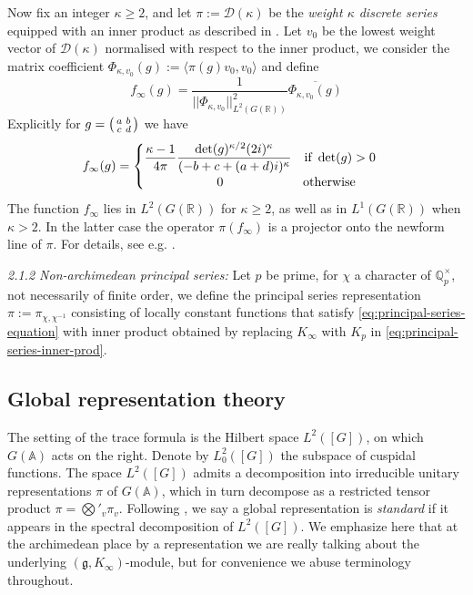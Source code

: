 \documentclass{article}
\numberwithin{equation}{section}
\begin{document}
\noindent Now fix an integer $\kappa \geq 2$, and let $\pi:=\mathcal{D}(\kappa)$ be the \emph{weight $\kappa$ discrete series} equipped with an inner product as described in \cite[\S11.7]{Traces}. Let $v_0$ be the lowest weight vector of $\mathcal{D}(\kappa)$ normalised with respect to the inner product, we consider the matrix coefficient $\Phi_{\kappa,v_0}(g):=\langle \pi(g)v_0,v_0 \rangle$ and define
$$f_\infty(g)=\frac{1}{||\Phi_{\kappa,v_0}||^2_{L^2(G(\mathbb{R}))}}\overline{\Phi_{\kappa, v_0}(g)}$$
Explicitly for $g=\begin{psmallmatrix}
    a & b \\ c & d
\end{psmallmatrix}$ we have
\begin{equation}\label{def:matrix-coeff}
    f_\infty(g) = 
    \begin{cases}
        \displaystyle\frac{\kappa-1}{4\pi} \frac{\det(g)^{\kappa/2}(2i)^\kappa}{(-b+c+(a+d)i)^\kappa} \quad \text{if } \det(g)> 0 \\
        \hspace{2cm} 0 \hspace{2.2cm} \text{otherwise}
    \end{cases}
\end{equation}
The function $f_\infty$ lies in $L^2(G(\mathbb{R}))$ for $\kappa\geq 2$, as well as in $L^1(G(\mathbb{R}))$ when $\kappa>2$. In the latter case the operator $\pi(f_\infty)$ is a projector onto the newform line of $\pi$. For details, see e.g. \cite[\S 14]{Traces}. \bigbreak

\noindent \emph{2.1.2 Non-archimedean principal series:} Let $p$ be prime, for $\chi$ a character of $\mathbb{Q}_p^\times$, not necessarily of finite order, we define the principal series representation $\pi:=\pi_{\chi,\chi^{-1}}$ consisting of locally constant functions that satisfy \eqref{eq:principal-series-equation} with inner product obtained by replacing $K_\infty$ with $K_p$ in \eqref{eq:principal-series-inner-prod}. \bigbreak

\subsection{Global representation theory}
The setting of the trace formula is the Hilbert space $L^2([G])$, on which $G(\mathbb{A})$ acts on the right. Denote by $L_0^2([G])$ the subspace of cuspidal functions. The space $L^2([G])$ admits a decomposition into irreducible unitary representations $\pi$ of $G(\mathbb{A})$, which in turn  decompose as a restricted tensor product $\pi = \bigotimes'_v \pi_v$. Following \cite[\S 2.2.1]{Michel_2010}, we say a global representation is \emph{standard} if it appears in the spectral decomposition of $L^2([G])$. We emphasize here that at the archimedean place by a representation we are really talking about the underlying $(\mathfrak{g},K_\infty)$-module, but for convenience we abuse terminology throughout. \bigbreak
\end{document}
